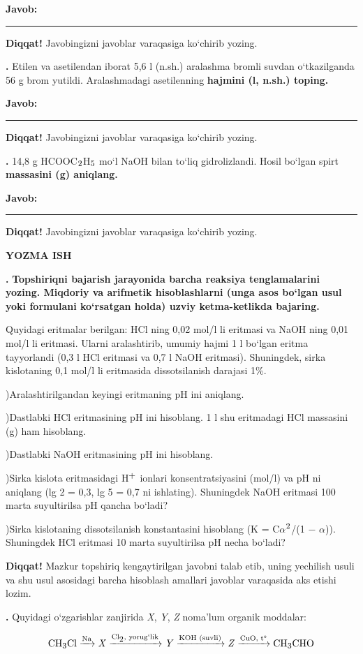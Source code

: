 \documentclass[11pt,a4paper]{article}
\renewcommand{\textsubscript}[1]{\ensuremath{_{\text{\fontsize{8}{8}\selectfont #1}}}}
\renewcommand{\textsuperscript}[1]{\ensuremath{^{\text{\fontsize{8}{8}\selectfont #1}}}}
\newcommand{\qn}[1]{\textbf{\fontsize{11.5}{13}\selectfont #1}}
\newcommand{\qsep}{\par\vspace{1pt}\noindent\rule{0pt}{0.4pt}\par\vspace{5pt}}
\newcommand{\diqqat}[1]{\par\smallskip\noindent\textbf{Diqqat!} #1\par\medskip}
\newcommand{\javob}{\par\smallskip\noindent\textbf{Javob:} \rule[-2pt]{7.5cm}{0.4pt}\par\smallskip\noindent\textbf{Diqqat!} Javobingizni javoblar varaqasiga ko`chirib yozing.\par\medskip}
\begin{document}
\javob\qsep
\noindent\qn{39.} Etilen va asetilendan iborat 5,6 l (n.sh.) aralashma bromli suvdan o`tkazilganda 56 g brom yutildi. Aralashmadagi asetilenning \textbf{hajmini (l, n.sh.) toping.}
\javob\qsep
\noindent\qn{40.} 14,8 g HCOOC\textsubscript{2}H\textsubscript{5} mo`l NaOH bilan to`liq gidrolizlandi. Hosil bo`lgan spirt \textbf{massasini (g) aniqlang.}
\javob\qsep
\par\bigskip\begin{center}\textbf{\fontsize{13}{15}\selectfont YOZMA ISH}\end{center}
\noindent\qn{41.} \textbf{Topshiriqni bajarish jarayonida barcha reaksiya tenglamalarini yozing. Miqdoriy va arifmetik hisoblashlarni (unga asos bo`lgan usul yoki formulani ko`rsatgan holda) uzviy ketma-ketlikda bajaring.}\par\smallskip
Quyidagi eritmalar berilgan: HCl ning 0,02 mol/l li eritmasi va NaOH ning 0,01 mol/l li eritmasi. Ularni aralashtirib, umumiy hajmi 1 l bo`lgan eritma tayyorlandi (0,3 l HCl eritmasi va 0,7 l NaOH eritmasi). Shuningdek, sirka kislotaning 0,1 mol/l li eritmasida dissotsilanish darajasi 1\%.\par
{})Aralashtirilgandan keyingi eritmaning pH ini aniqlang.\par
{})Dastlabki HCl eritmasining pH ini hisoblang. 1 l shu eritmadagi HCl massasini (g) ham hisoblang.\par
{})Dastlabki NaOH eritmasining pH ini hisoblang.\par
{})Sirka kislota eritmasidagi H\textsuperscript{+} ionlari konsentratsiyasini (mol/l) va pH ni aniqlang (lg 2 = 0,3, lg 5 = 0,7 ni ishlating). Shuningdek NaOH eritmasi 100 marta suyultirilsa pH qancha bo`ladi?\par
{})Sirka kislotaning dissotsilanish konstantasini hisoblang (K = C$\alpha$\textsuperscript{2}/(1 $-$ $\alpha$)). Shuningdek HCl eritmasi 10 marta suyultirilsa pH necha bo`ladi?\par
\diqqat{Mazkur topshiriq kengaytirilgan javobni talab etib, uning yechilish usuli va shu usul asosidagi barcha hisoblash amallari javoblar varaqasida aks etishi lozim.}\qsep
\noindent\qn{42.} Quyidagi o`zgarishlar zanjirida \textit{X}, \textit{Y}, \textit{Z} noma'lum organik moddalar:\par
\[\setlength{\fboxsep}{0pt}\text{CH\textsubscript{3}Cl}\xrightarrow{\text{Na}}\text{\textit{X}}\xrightarrow{\text{Cl\textsubscript{2}, yorug`lik}}\text{\textit{Y}}\xrightarrow{\text{KOH (suvli)}}\text{\textit{Z}}\xrightarrow{\text{CuO, t\textdegree{}}}\text{CH\textsubscript{3}CHO}\]
\end{document}
